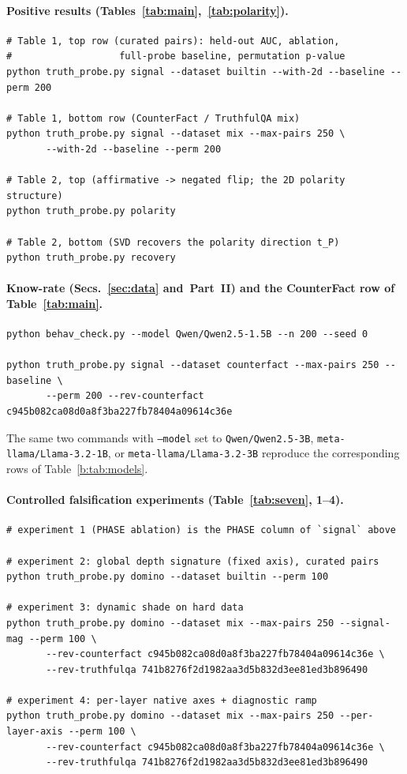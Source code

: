 \documentclass[11pt]{article}
\begin{document}
\paragraph{Positive results (Tables~\ref{tab:main},~\ref{tab:polarity}).}
\begin{verbatim}
# Table 1, top row (curated pairs): held-out AUC, ablation,
#                   full-probe baseline, permutation p-value
python truth_probe.py signal --dataset builtin --with-2d --baseline --perm 200

# Table 1, bottom row (CounterFact / TruthfulQA mix)
python truth_probe.py signal --dataset mix --max-pairs 250 \
       --with-2d --baseline --perm 200

# Table 2, top (affirmative -> negated flip; the 2D polarity structure)
python truth_probe.py polarity

# Table 2, bottom (SVD recovers the polarity direction t_P)
python truth_probe.py recovery
\end{verbatim}

\paragraph{Know-rate (Secs.~\ref{sec:data} and~Part~II) and the CounterFact row of Table~\ref{tab:main}.}
\begin{verbatim}
python behav_check.py --model Qwen/Qwen2.5-1.5B --n 200 --seed 0

python truth_probe.py signal --dataset counterfact --max-pairs 250 --baseline \
       --perm 200 --rev-counterfact c945b082ca08d0a8f3ba227fb78404a09614c36e
\end{verbatim}
The same two commands with \texttt{--model} set to \texttt{Qwen/Qwen2.5-3B},
\texttt{meta-llama/Llama-3.2-1B}, or \texttt{meta-llama/Llama-3.2-3B}
reproduce the corresponding rows of Table~\ref{b:tab:models}.

\paragraph{Controlled falsification experiments (Table~\ref{tab:seven}, 1--4).}
\begin{verbatim}
# experiment 1 (PHASE ablation) is the PHASE column of `signal` above

# experiment 2: global depth signature (fixed axis), curated pairs
python truth_probe.py domino --dataset builtin --perm 100

# experiment 3: dynamic shade on hard data
python truth_probe.py domino --dataset mix --max-pairs 250 --signal-mag --perm 100 \
       --rev-counterfact c945b082ca08d0a8f3ba227fb78404a09614c36e \
       --rev-truthfulqa 741b8276f2d1982aa3d5b832d3ee81ed3b896490

# experiment 4: per-layer native axes + diagnostic ramp
python truth_probe.py domino --dataset mix --max-pairs 250 --per-layer-axis --perm 100 \
       --rev-counterfact c945b082ca08d0a8f3ba227fb78404a09614c36e \
       --rev-truthfulqa 741b8276f2d1982aa3d5b832d3ee81ed3b896490
\end{verbatim}
\end{document}
